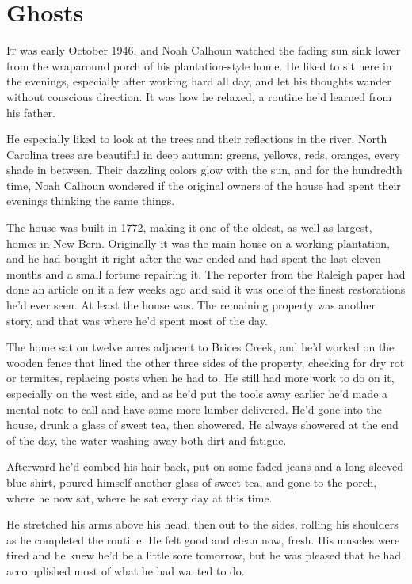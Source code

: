 \documentclass[10pt, twoside, openright]{book}
\newcommand{\chapterornament}[1]{\def\currentornament{#1}}
\def\currentornament{}
\begin{document}
		\newpage
\thispagestyle{empty}
\clearpage
\null
\chapterornament{89}
\chapter{Ghosts}

\lettrine[findent=0.3em, nindent=0.0em]{I}{t} was early October 1946, and Noah Calhoun watched the fading sun sink
lower from the wraparound porch of his plantation-style home. He liked
to sit here in the evenings, especially after working hard all day, and
let his thoughts wander without conscious direction. It was how he
relaxed, a routine he'd learned from his father.

He especially liked to look at the trees and their reflections in the
river. North Carolina trees are beautiful in deep autumn: greens,
yellows, reds, oranges, every shade in between. Their dazzling colors
glow with the sun, and for the hundredth time, Noah Calhoun wondered if
the original owners of the house had spent their evenings thinking the
same things.

The house was built in 1772, making it one of the oldest, as well as
largest, homes in New Bern. Originally it was the main house on a
working plantation, and he had bought it right after the war ended and
had spent the last eleven months and a small fortune repairing it. The
reporter from the Raleigh paper had done an article on it a few weeks
ago and said it was one of the finest restorations he'd ever seen. At
least the house was. The remaining property was another story, and that
was where he'd spent most of the day.

The home sat on twelve acres adjacent to Brices Creek, and he'd worked
on the wooden fence that lined the other three sides of the property,
checking for dry rot or termites, replacing posts when he had to. He
still had more work to do on it, especially on the west side, and as
he'd put the tools away earlier he'd made a mental note to call and have
some more lumber delivered. He'd gone into the house, drunk a glass of
sweet tea, then showered. He always showered at the end of the day, the
water washing away both dirt and fatigue.

Afterward he'd combed his hair back, put on some faded jeans and a
long-sleeved blue shirt, poured himself another glass of sweet tea, and
gone to the porch, where he now sat, where he sat every day at this
time.

He stretched his arms above his head, then out to the sides, rolling his
shoulders as he completed the routine. He felt good and clean now,
fresh. His muscles were tired and he knew he'd be a little sore
tomorrow, but he was pleased that he had accomplished most of what he
had wanted to do.
\end{document}
